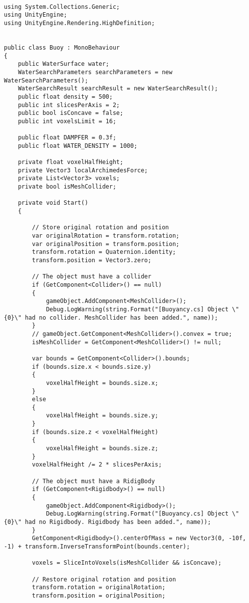 \begin{lstlisting}

using System.Collections.Generic;
using UnityEngine;
using UnityEngine.Rendering.HighDefinition;


public class Buoy : MonoBehaviour
{
    public WaterSurface water;
    WaterSearchParameters searchParameters = new WaterSearchParameters();
    WaterSearchResult searchResult = new WaterSearchResult();
	public float density = 500;
	public int slicesPerAxis = 2;
	public bool isConcave = false;
	public int voxelsLimit = 16;

	public float DAMPFER = 0.3f;
	public float WATER_DENSITY = 1000;

	private float voxelHalfHeight;
	private Vector3 localArchimedesForce;
	private List<Vector3> voxels;
	private bool isMeshCollider;

	private void Start()
	{

		// Store original rotation and position
		var originalRotation = transform.rotation;
		var originalPosition = transform.position;
		transform.rotation = Quaternion.identity;
		transform.position = Vector3.zero;

		// The object must have a collider
		if (GetComponent<Collider>() == null)
		{
			gameObject.AddComponent<MeshCollider>();
			Debug.LogWarning(string.Format("[Buoyancy.cs] Object \"{0}\" had no collider. MeshCollider has been added.", name));
		}
		// gameObject.GetComponent<MeshCollider>().convex = true;
		isMeshCollider = GetComponent<MeshCollider>() != null;

		var bounds = GetComponent<Collider>().bounds;
		if (bounds.size.x < bounds.size.y)
		{
			voxelHalfHeight = bounds.size.x;
		}
		else
		{
			voxelHalfHeight = bounds.size.y;
		}
		if (bounds.size.z < voxelHalfHeight)
		{
			voxelHalfHeight = bounds.size.z;
		}
		voxelHalfHeight /= 2 * slicesPerAxis;

		// The object must have a RidigBody
		if (GetComponent<Rigidbody>() == null)
		{
			gameObject.AddComponent<Rigidbody>();
			Debug.LogWarning(string.Format("[Buoyancy.cs] Object \"{0}\" had no Rigidbody. Rigidbody has been added.", name));
		}
		GetComponent<Rigidbody>().centerOfMass = new Vector3(0, -10f, -1) + transform.InverseTransformPoint(bounds.center);

		voxels = SliceIntoVoxels(isMeshCollider && isConcave);

		// Restore original rotation and position
		transform.rotation = originalRotation;
		transform.position = originalPosition;


\end{lstlisting}
